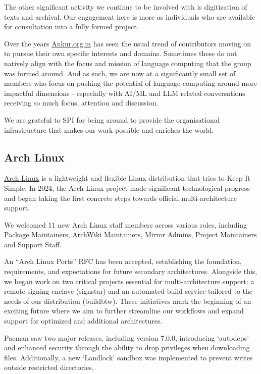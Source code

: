 \documentclass[a4paper]{report}
\begin{document}
The other significant activity we continue to be involved with is digitization of texts and archival. Our engagement here is more as individuals who are available for consultation into a fully formed project.

Over the years \href{https://ankur.org.in/}{Ankur.org.in} has seen the usual trend of contributors moving on to pursue their own specific interests and domains. Sometimes these do not natively align with the focus and mission of language computing that the group was formed around. And as such, we are now at a significantly small set of members who focus on pushing the potential of language computing around more impactful dimensions - especially with AI/ML and LLM related conversations receiving so much focus, attention and discussion.

We are grateful to SPI for being around to provide the organisational infrastructure that makes our work possible and enriches the world.

\subsection{Arch Linux}

\href{https://archlinux.org/}{Arch Linux} is a lightweight and flexible Linux distribution that tries to Keep It Simple. In 2024, the Arch Linux project made significant technological progress and began taking the first concrete steps towards official multi-architecture support.

We welcomed 11 new Arch Linux staff members across various roles, including Package Maintainers, ArchWiki Maintainers, Mirror Admins, Project Maintainers and Support Staff.

An “Arch Linux Ports” RFC has been accepted, establishing the foundation, requirements, and expectations for future secondary architectures. Alongside this, we began work on two critical projects essential for multi-architecture support: a remote signing enclave (signstar) and an automated build service tailored to the needs of our distribution (buildbtw). These initiatives mark the beginning of an exciting future where we aim to further streamline our workflows and expand support for optimized and additional architectures.

Pacman saw two major releases, including version 7.0.0, introducing `autodeps' and enhanced security through the ability to drop privileges when downloading files. Additionally, a new `Landlock' sandbox was implemented to prevent writes outside restricted directories.
\end{document}
